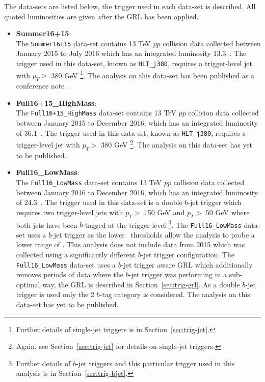 The data-sets are listed below, the trigger used in each data-set is described.
All quoted luminosities are given after the GRL has been applied.

\begin{itemize}[leftmargin=*]
\item\textbf{Summer16+15}: \\
  The \verb|Summer16+15| data-set contains 13 TeV $pp$ collision data collected
  between January 2015 to July 2016 which has an integrated luminosity 13.3~\ifb.
  The trigger used in this data-set, known as \verb|HLT_j380|,
  requires a trigger-level jet with $p_T >$ 380 GeV
  \footnote{\label{foot1} Further details of single-jet triggers is in Section~\ref{sec:trig-jet}.}.
  The analysis on this data-set has been published as a conference note~\cite{dibjet-ichep_conf}. \\
  
\item\textbf{Full16+15\_HighMass}:\\
  The \verb|Full16+15_HighMass| data-set contains 13 TeV $pp$ collision data collected
  between January 2015 to December 2016, which has an integrated luminosity of 36.1~\ifb.
  The trigger used in this data-set, known as \verb|HLT_j380|,
  requires a trigger-level jet with $p_T >$ 380 GeV
  \footnote{Again, see  Section~\ref{sec:trig-jet} for details on single-jet triggers.}.
  The analysis on this data-set has yet to be published.\\
  
\item\textbf{Full16\_LowMass}: \\
  The \verb|Full16_LowMass| data-set contains 13 TeV $pp$ collision data collected
  between January 2016 to December 2016, which has an integrated luminosity of 24.3~\ifb.
  The trigger used in this data-set is a double $b$-jet trigger 
  which requires two trigger-level jets with $p_T >$ 150 GeV and $p_T >$ 50 GeV
  where both jets have been $b$-tagged at the trigger level
  \footnote{Further details of $b$-jet triggers and this particular trigger used in this analysis is in Section~\ref{sec:trig-bjet}.}.
  The \verb|Full16_LowMass| data-set uses a $b$-jet trigger as the lower \pT~thresholds allow
  the analysis to probe a lower range of \mjj.
  This analysis does not include data from 2015 which was collected using a significantly different $b$-jet trigger configuration.
  The \verb|Full16_LowMass| data-set uses a $b$-jet trigger aware GRL which additionally
  removes periods of data where the $b$-jet trigger was performing in a sub-optimal way,
  the GRL is described in Section~\ref{sec:trig-grl}.
  As a double $b$-jet trigger is used only the 2 $b$-tag category is considered.
  The analysis on this data-set has yet to be published.

\end{itemize}

